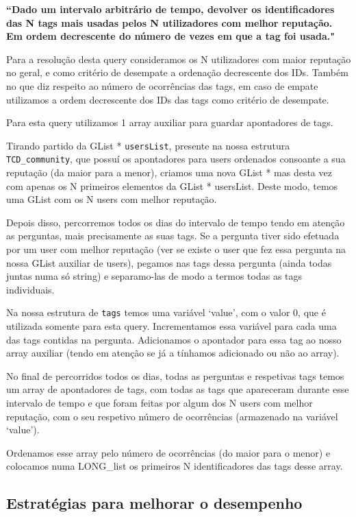 \documentclass[a4paper]{article}
\begin{document}
\textbf{“Dado um intervalo arbitrário de tempo, devolver os identificadores das N tags
mais usadas pelos N utilizadores com melhor reputação. Em ordem decrescente do número
de vezes em que a tag foi usada."}

Para a resolução desta query consideramos os N utilizadores com maior reputação no geral,
e como critério de desempate a ordenação decrescente dos IDs. Também no que diz respeito
ao número de ocorrências das tags, em caso de empate utilizamos a ordem decrescente dos
IDs das tags como critério de desempate.

Para esta query utilizamos 1 array auxiliar para guardar apontadores de tags.

Tirando partido da GList * \texttt{usersList}, presente na nossa estrutura
\texttt{TCD\_community},
que possuí os apontadores para users ordenados consoante a sua reputação (da maior
para a menor), criamos uma nova GList * mas desta vez com apenas os N primeiros
elementos da GList * usersList. Deste modo, temos uma GList com os N users com
melhor reputação.

Depois disso, percorremos todos os dias do intervalo
de tempo tendo em atenção as perguntas, mais precisamente as suas tags.
Se a pergunta tiver sido efetuada por um user com melhor reputação (ver se existe
o user que fez essa pergunta na nossa GList auxiliar de users), pegamos nas tags
dessa pergunta (ainda todas juntas numa só string) e separamo-las de modo a termos
todas as tags individuais.

Na nossa estrutura de \texttt{tags} temos uma variável \textsf{‘value’}, com o valor 0,
que é utilizada somente para esta query. Incrementamos essa variável para cada
uma das tags contidas na pergunta. Adicionamos o apontador para essa tag ao nosso
array auxiliar (tendo em atenção se já a tínhamos adicionado ou não ao array).

No final de percorridos todos os dias, todas as perguntas e respetivas tags
temos um array de apontadores de tags, com todas as tags que apareceram durante
esse intervalo de tempo e que foram feitas por algum dos N users com melhor reputação,
com o seu respetivo número de ocorrências (armazenado na variável \textsf{‘value’}).

Ordenamos esse array pelo número de ocorrências (do maior para o menor) e
colocamos numa LONG\_list os primeiros N identificadores das tags desse array.


\subsection{Estratégias para melhorar o desempenho}
\label{sec:desempenho}
\end{document}

